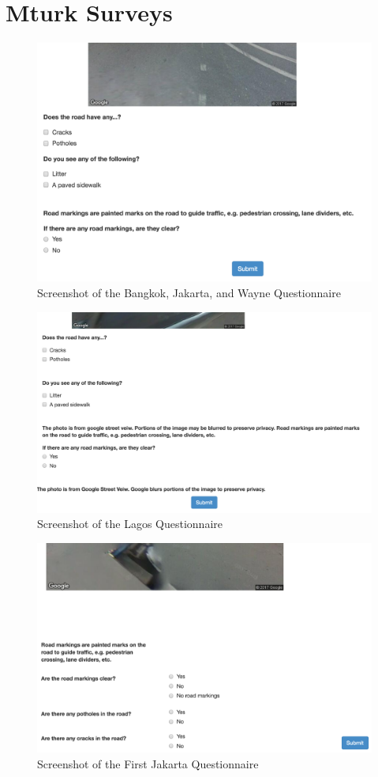 \documentclass[12pt, letterpaper]{article}
\begin{document}
\section{Mturk Surveys}
\label{mturk_surveys}
\begin{figure}[h]
\centering
\caption{Screenshot of the Bangkok, Jakarta, and Wayne Questionnaire}\label{fig:mturk_bangkok}
\includegraphics[scale=0.5]{../data/mturk/bangkok_mturk_screenshot.png}
\end{figure}

\clearpage

\begin{figure}
\centering
\caption{Screenshot of the Lagos Questionnaire}\label{fig:mturk_lagos}
\includegraphics[scale=0.5]{../data/mturk/lagos_mturk_screenshot.png}
\end{figure}

\clearpage

\begin{figure}
\centering
\caption{Screenshot of the First Jakarta Questionnaire}\label{fig:mturk_jakarta}
\includegraphics[scale=0.5]{../data/mturk/jakarta_mturk_screenshot.png}
\end{figure}
\end{document}
